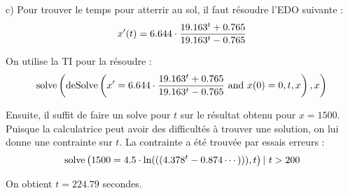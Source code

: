 c) Pour trouver le temps pour atterrir au sol, il faut résoudre l'EDO suivante :
\begin{align*}
    x'(t) = 6.644\cdot\dfrac{19.163^t + 0.765}{19.163^t - 0.765}
\end{align*}

On utilise la TI pour la résoudre :
\begin{align*}
    \operatorname{solve}\left({\operatorname{deSolve}\left({x'=6.644\cdot\dfrac{19.163^t + 0.765}{19.163^t - 0.765}
    \ \text{and } x(0)=0,t,x}\right),x}\right)
\end{align*}

Ensuite, il suffit de faire un solve pour $t$ sur le résultat obtenu pour $x=1500$.
Puisque la calculatrice peut avoir des difficultés à trouver une solution, on lui
donne une contrainte sur $t$. La contrainte a été trouvée par essais erreurs :
\begin{align*}
    \operatorname{solve}\left({1500 = 4.5\cdot\ln(((4.378^t-0.874\cdots))),t}\right)|\ t>200
\end{align*}

On obtient $t = 224.79$ secondes.
